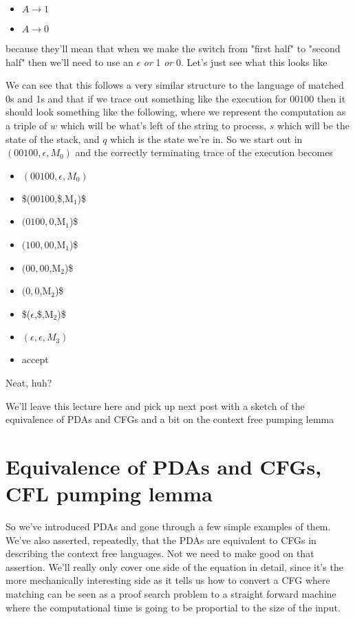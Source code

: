 \documentclass[11pt]{article}
\begin{document}
\begin{itemize}
\item $A \to 1$
\item $A \to 0$
\end{itemize}

because they'll mean that when we make the switch from "first half" to "second half" then we'll need to use an $\epsilon$ \emph{or} 1 \emph{or} 0. Let's just see what this looks like

We can see that this follows a very similar structure to the language of matched 0s and 1s and that if we trace out something like the execution for $00100$ then it should look something like the following, where we represent the computation as a triple of $w$ which will be what's left of the string to process, $s$ which will be the state of the stack, and $q$ which is the state we're in. So we start out in $(00100,\epsilon,M_0)$ and the correctly terminating trace of the execution becomes

\begin{itemize}
\item $(00100,\epsilon,M_0)$
\item \$(00100,\$,M$_{\text{1}}$)\$
\item $(0100,0$,M$_{\text{1}}$)\$
\item $(100,00$,M$_{\text{1}}$)\$
\item $(00,00$,M$_{\text{2}}$)\$
\item $(0,0$,M$_{\text{2}}$)\$
\item \$($\epsilon$,\$,M$_{\text{2}}$)\$
\item $(\epsilon,\epsilon,M_3)$
\item accept
\end{itemize}

Neat, huh?

We'll leave this lecture here and pick up next post with a sketch of the equivalence of PDAs and CFGs and a bit on the context free pumping lemma

\section{Equivalence of PDAs and CFGs, CFL pumping lemma}
\label{sec-8}
So we've introduced PDAs and gone through a few simple examples of them. We've also asserted, repeatedly, that the PDAs are equivalent to CFGs in describing the context free languages. Not we need to make good on that assertion. We'll really only cover one side of the equation in detail, since it's the more mechanically interesting side as it tells us how to convert a CFG where matching can be seen as a proof search problem to a straight forward machine where the computational time is going to be proportial to the size of the input. 
\end{document}
